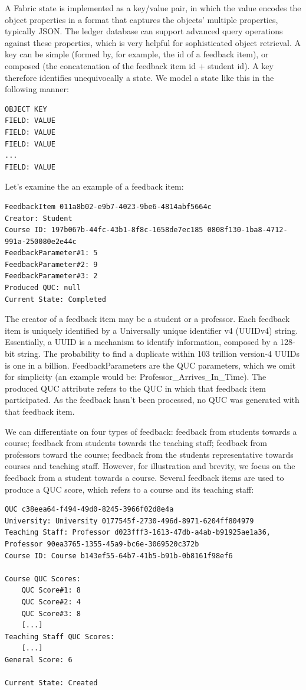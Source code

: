 \documentclass[12pt,a4paper]{article}
\theoremstyle{definition}
\begin{document}
  A Fabric state is implemented as a key/value pair, in which the value encodes the object properties in a format that captures the objects' multiple properties, typically JSON. The ledger database can support advanced query operations against these properties, which is very helpful for sophisticated object retrieval. A key can be simple (formed by, for example, the id of a feedback item), or composed (the concatenation of the feedback item id + student id). A key therefore identifies unequivocally a state.  We model a state like this in the following manner:
 \begin{verbatim}
OBJECT KEY
FIELD: VALUE
FIELD: VALUE
FIELD: VALUE
...
FIELD: VALUE
\end{verbatim}
 
Let’s examine the an example of a feedback item:

\begin{verbatim}
FeedbackItem 011a8b02-e9b7-4023-9be6-4814abf5664c
Creator: Student 
Course ID: 197b067b-44fc-43b1-8f8c-1658de7ec185 0808f130-1ba8-4712-991a-250080e2e44c 
FeedbackParameter#1: 5
FeedbackParameter#2: 9
FeedbackParameter#3: 2
Produced QUC: null
Current State: Completed
\end{verbatim}

The creator of a feedback item may be a student or a professor. Each feedback item is uniquely identified by a Universally unique identifier  v4 (UUIDv4) string. Essentially, a UUID is a mechanism to identify information, composed by a 128-bit string. The probability to find a duplicate within 103 trillion version-4 UUIDs is one in a billion. FeedbackParameters are the QUC parameters, which we omit for simplicity (an example would be: Professor\_Arrives\_In\_Time).  The produced QUC attribute refers to the QUC in which that feedback item participated. As the feedback hasn't  been processed, no QUC was generated with that feedback item. 

We can differentiate on four types of feedback: feedback from students towards a course; feedback from students towards the teaching staff; feedback from professors toward the course; feedback from the students representative towards courses and teaching staff. However, for illustration and brevity, we focus on the feedback from a student towards a course. Several feedback items are used to produce a QUC score, which refers to a course and its teaching staff:


\begin{verbatim}
QUC c38eea64-f494-49d0-8245-3966f02d8e4a
University: University 0177545f-2730-496d-8971-6204ff804979
Teaching Staff: Professor d023fff3-1613-47db-a4ab-b91925ae1a36, Professor 90ea3765-1355-45a9-bc6e-3069520c372b
Course ID: Course b143ef55-64b7-41b5-b91b-0b8161f98ef6

Course QUC Scores:
    QUC Score#1: 8
    QUC Score#2: 4
    QUC Score#3: 8
    [...]
Teaching Staff QUC Scores:
    [...]
General Score: 6

Current State: Created
\end{verbatim}
\end{document}
